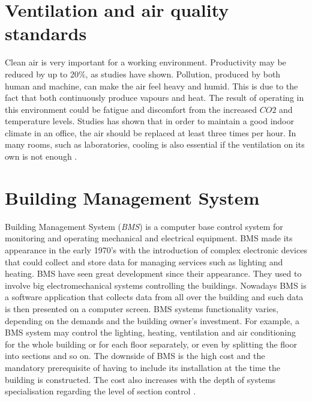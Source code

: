 \documentclass[12pt,a4paper]{report}
\begin{document}
\section {Ventilation and air quality standards}
Clean air is very important for a working environment. Productivity may be reduced by up to 20\%, as studies have shown. Pollution, produced by both human and machine, can make the air feel heavy and humid. This is due to the fact that both continuously produce vapours and heat. The result of operating in this environment could be fatigue and discomfort from the increased $CO2$ and temperature levels. Studies has shown that in order to maintain a good indoor climate in an office, the air should be replaced at least three times per hour. In many rooms, such as laboratories, cooling is also essential if the ventilation on its own is not enough \cite{website:ventilation}.
%
\section{Building Management System}
Building Management System (\textit{BMS}) is a computer base control system for monitoring and operating mechanical and electrical equipment.
BMS made its appearance in the early 1970's with the introduction of complex electronic devices that could collect and store data for managing services such as lighting and heating. BMS have seen great development since their appearance.
They used to involve big electromechanical systems controlling the buildings.
Nowadays BMS is a software application that collects data from all over the building and such data is then presented on a computer screen.
BMS systems functionality varies, depending on the demands and the building owner's investment.
For example, a BMS system may control the lighting, heating, ventilation and air conditioning for the whole building or for each floor separately, or even by splitting the floor into sections and so on.
The downside of BMS is the high cost and the mandatory prerequisite of having to include its installation at the time the building is constructed.
The cost also increases with the depth of systems specialisation regarding the level of section control \cite{website:bms}.
%
\end{document}

